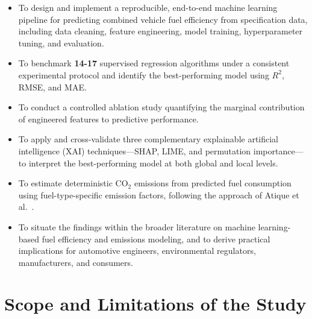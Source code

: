 \begin{itemize}
    \item To design and implement a reproducible, end-to-end machine learning pipeline for predicting combined vehicle fuel efficiency from specification data, including data cleaning, feature engineering, model training, hyperparameter tuning, and evaluation.

    \item To benchmark \textbf{14-17} supervised regression algorithms under a consistent experimental protocol and identify the best-performing model using $R^2$, RMSE, and MAE.

    \item To conduct a controlled ablation study quantifying the marginal contribution of engineered features to predictive performance.

    \item To apply and cross-validate three complementary explainable artificial intelligence (XAI) techniques---SHAP, LIME, and permutation importance---to interpret the best-performing model at both global and local levels.

    \item To estimate deterministic CO$_2$ emissions from predicted fuel consumption using fuel-type-specific emission factors, following the approach of Atique et al.~\cite{atique2026explainable}.

    \item To situate the findings within the broader literature on machine learning-based fuel efficiency and emissions modeling, and to derive practical implications for automotive engineers, environmental regulators, manufacturers, and consumers.
\end{itemize}

\section{Scope and Limitations of the Study}

